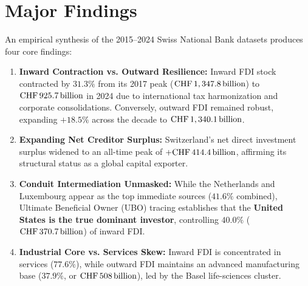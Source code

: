 
\section{Major Findings}

An empirical synthesis of the 2015--2024 Swiss National Bank datasets produces four core findings:

\begin{enumerate}[leftmargin=1.5em, itemsep=2pt]
    \item \textbf{Inward Contraction vs. Outward Resilience:} Inward FDI stock contracted by $31.3\%$ from its 2017 peak ($\text{CHF}\,1,347.8\,\text{billion}$) to $\text{CHF}\,925.7\,\text{billion}$ in 2024 due to international tax harmonization and corporate consolidations. Conversely, outward FDI remained robust, expanding $+18.5\%$ across the decade to $\text{CHF}\,1,340.1\,\text{billion}$.
    \item \textbf{Expanding Net Creditor Surplus:} Switzerland's net direct investment surplus widened to an all-time peak of \textbf{$+\text{CHF}\,414.4\,\text{billion}$}, affirming its structural status as a global capital exporter.
    \item \textbf{Conduit Intermediation Unmasked:} While the Netherlands and Luxembourg appear as the top immediate sources ($41.6\%$ combined), Ultimate Beneficial Owner (UBO) tracing establishes that the \textbf{United States is the true dominant investor}, controlling $40.0\%$ ($\text{CHF}\,370.7\,\text{billion}$) of inward FDI.
    \item \textbf{Industrial Core vs. Services Skew:} Inward FDI is concentrated in services ($77.6\%$), while outward FDI maintains an advanced manufacturing base ($37.9\%$, or $\text{CHF}\,508\,\text{billion}$), led by the Basel life-sciences cluster.
\end{enumerate}

